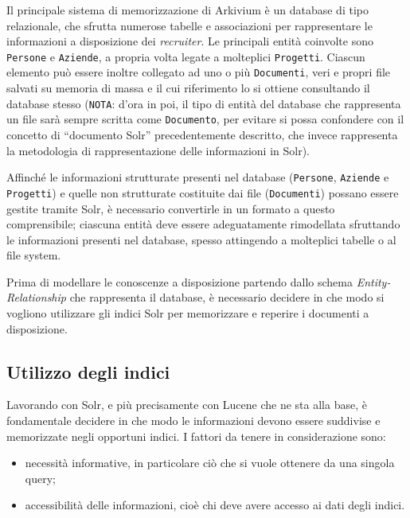 \vspace{1em}

Il principale sistema di memorizzazione di Arkivium è un database di tipo relazionale, che sfrutta numerose tabelle e associazioni per rappresentare le informazioni a disposizione dei \textit{recruiter}. Le principali entità coinvolte sono \texttt{Persone} e \texttt{Aziende}, a propria volta legate a molteplici \texttt{Progetti}. Ciascun elemento può essere inoltre collegato ad uno o più \texttt{Documenti}, veri e propri file salvati su memoria di massa e il cui riferimento lo si ottiene consultando il database stesso (\texttt{NOTA}: d’ora in poi, il tipo di entità del database che rappresenta un file sarà sempre scritta come \texttt{Documento}, per evitare si possa confondere con il concetto di “documento Solr” precedentemente descritto, che invece rappresenta la metodologia di rappresentazione delle informazioni in Solr).

\vspace{1em}

Affinché le informazioni strutturate presenti nel database (\texttt{Persone}, \texttt{Aziende} e \texttt{Progetti}) e quelle non strutturate costituite dai file (\texttt{Documenti}) possano essere gestite tramite Solr, è necessario convertirle in un formato a questo comprensibile; ciascuna entità deve essere adeguatamente rimodellata sfruttando le informazioni presenti nel database, spesso attingendo a molteplici tabelle o al file system.

Prima di modellare le conoscenze a disposizione partendo dallo schema \textit{Entity-Relationship} che rappresenta il database, è necessario decidere in che modo si vogliono utilizzare gli indici Solr per memorizzare e reperire i documenti a disposizione.



\subsection{Utilizzo degli indici}

Lavorando con Solr, e più precisamente con Lucene che ne sta alla base, è fondamentale decidere in che modo le informazioni devono essere suddivise e memorizzate negli opportuni indici. I fattori da tenere in considerazione sono:

\begin{itemize}
\item necessità informative, in particolare ciò che si vuole ottenere da una singola query;
\item accessibilità delle informazioni, cioè chi deve avere accesso ai dati degli indici.
\end{itemize}


